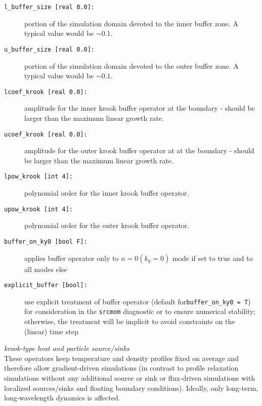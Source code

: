 \documentclass[12pt]{article}
\begin{document}
\begin{description}
\item[\texttt{l\_buffer\_size [real 0.0]:}] portion of the simulation domain devoted to the inner buffer zone. A typical value would be $\sim 0.1$.
\item[\texttt{u\_buffer\_size [real 0.0]:}] portion of the simulation domain devoted to the outer buffer zone. A typical value would be $\sim 0.1$.
\item[\texttt{lcoef\_krook [real 0.0]:}] amplitude for the inner krook buffer operator at the boundary - should be larger than the maximum linear growth rate.
\item[\texttt{ucoef\_krook [real 0.0]:}] amplitude for the outer krook buffer operator at at the boundary - should be larger than the maximum linear growth rate.
\item[\texttt{lpow\_krook [int 4]:}] polynomial order for the inner krook buffer operator.
\item[\texttt{upow\_krook [int 4]:}] polynomial order for the outer krook buffer operator.
\item[\texttt{buffer\_on\_ky0 [bool F]:}] applies buffer operator only to $n=0 (k_y = 0)$ mode if set to true and to all modes else
\item[\texttt{explicit\_buffer [bool]:}] use explicit treatment of buffer operator (default for\texttt{buffer\_on\_ky0 = T}) for consideration in the {\tt srcmom}
diagnostic or to ensure numerical stability; otherwise, the treatment will be implicit to avoid constraints on the (linear) time step
\end{description}
%
{\em krook-type heat and particle source/sinks}\\[1ex]
These operators keep temperature and density profiles fixed on average and therefore allow gradient-driven simulations (in contrast to profile relaxation
simulations without any additional source or sink or flux-driven simulations with localized sources/sinks and floating boundary conditions). Ideally,
only long-term, long-wavelength dynamics is affected.
\end{document}
